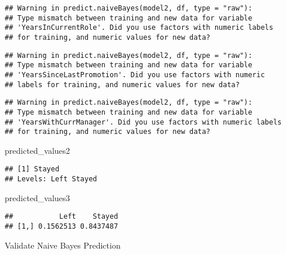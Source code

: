 \documentclass[
]{article}
\newenvironment{Shaded}{\begin{snugshade}}{\end{snugshade}}
\newcommand{\CommentTok}[1]{\textcolor[rgb]{0.56,0.35,0.01}{\textit{#1}}}
\newcommand{\NormalTok}[1]{#1}
\begin{document}
\begin{verbatim}
## Warning in predict.naiveBayes(model2, df, type = "raw"):
## Type mismatch between training and new data for variable
## 'YearsInCurrentRole'. Did you use factors with numeric labels
## for training, and numeric values for new data?
\end{verbatim}

\begin{verbatim}
## Warning in predict.naiveBayes(model2, df, type = "raw"):
## Type mismatch between training and new data for variable
## 'YearsSinceLastPromotion'. Did you use factors with numeric
## labels for training, and numeric values for new data?
\end{verbatim}

\begin{verbatim}
## Warning in predict.naiveBayes(model2, df, type = "raw"):
## Type mismatch between training and new data for variable
## 'YearsWithCurrManager'. Did you use factors with numeric labels
## for training, and numeric values for new data?
\end{verbatim}

\begin{Shaded}
\begin{Highlighting}[]
\NormalTok{predicted\_values2}
\end{Highlighting}
\end{Shaded}

\begin{verbatim}
## [1] Stayed
## Levels: Left Stayed
\end{verbatim}

\begin{Shaded}
\begin{Highlighting}[]
\NormalTok{predicted\_values3}
\end{Highlighting}
\end{Shaded}

\begin{verbatim}
##           Left    Stayed
## [1,] 0.1562513 0.8437487
\end{verbatim}

Validate Naive Bayes Prediction

\begin{Shaded}
\end{Shaded}
\end{document}
